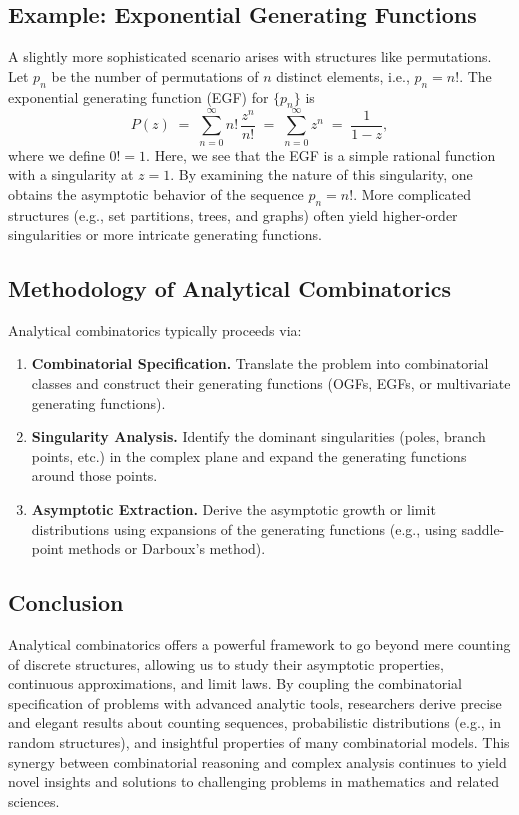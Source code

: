 \documentclass[12p]{article}
\newcounter{answercounter}
\newenvironment{answer}[1][]
{\refstepcounter{answercounter}%
\begin{tcolorbox}[
    title=Answer \theanswercounter: #1,
    colback=white, %
    colframe=gray,
    coltext=black, %
    fonttitle=\bfseries\normalsize,
    top=2mm,
    bottom=2mm,
    enlarge top initially by=5mm
]
\small
}
{\end{tcolorbox}}
\begin{document}
\begin{answer}[by openai/o1 (generated in 0 minutes and 20 seconds.)]
\subsection*{Example: Exponential Generating Functions}

A slightly more sophisticated scenario arises with structures like permutations. Let \(p_n\) be the number of permutations of \(n\) distinct elements, i.e., \(p_n = n!\). The exponential generating function (EGF) for \(\{p_n\}\) is
\[
P(z) \;=\; \sum_{n=0}^{\infty} n!\,\frac{z^n}{n!}
\;=\; \sum_{n=0}^{\infty} z^n
\;=\; \frac{1}{1 - z},
\]
where we define \(0! = 1\). Here, we see that the EGF is a simple rational function with a singularity at \(z=1\). By examining the nature of this singularity, one obtains the asymptotic behavior of the sequence \(p_n = n!\). More complicated structures (e.g., set partitions, trees, and graphs) often yield higher-order singularities or more intricate generating functions.

\subsection*{Methodology of Analytical Combinatorics}

Analytical combinatorics typically proceeds via:
\begin{enumerate}
\item \textbf{Combinatorial Specification.} Translate the problem into combinatorial classes and construct their generating functions (OGFs, EGFs, or multivariate generating functions).
\item \textbf{Singularity Analysis.} Identify the dominant singularities (poles, branch points, etc.) in the complex plane and expand the generating functions around those points.
\item \textbf{Asymptotic Extraction.} Derive the asymptotic growth or limit distributions using expansions of the generating functions (e.g., using saddle-point methods or Darboux’s method).
\end{enumerate}

\subsection*{Conclusion}

Analytical combinatorics offers a powerful framework to go beyond mere counting of discrete structures, allowing us to study their asymptotic properties, continuous approximations, and limit laws. By coupling the combinatorial specification of problems with advanced analytic tools, researchers derive precise and elegant results about counting sequences, probabilistic distributions (e.g., in random structures), and insightful properties of many combinatorial models. This synergy between combinatorial reasoning and complex analysis continues to yield novel insights and solutions to challenging problems in mathematics and related sciences.
\end{answer}
\end{document}
